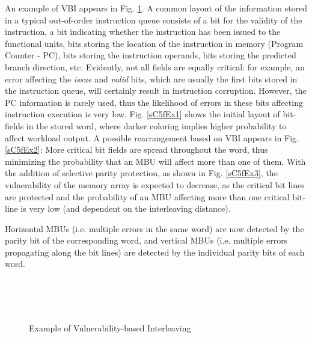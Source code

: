 \documentclass[12pt]{yalephd}
\begin{document}
An example of VBI appears in Fig. \ref{sC5fVBIExample}. A common layout of the information stored in a typical out-of-order instruction queue consists of a bit for the validity of the instruction, a bit indicating whether the instruction has been issued to the functional units, bits storing the location of the instruction in memory (Program Counter - PC), bits storing the instruction operands, bits storing the predicted branch direction, etc. Evidently, not all fields are equally critical: for example, an error affecting the {\em issue} and {\em valid} bits, which are usually the first bits stored in the instruction queue, will certainly result in instruction corruption. However, the PC information is rarely used, thus the likelihood of errors in these bits affecting instruction execution is very low. Fig. \ref{sC5fEx1} shows the initial layout of bit-fields in the stored word, where darker coloring implies higher probability to affect workload output. A possible rearrangement based on VBI appears in Fig. \ref{sC5fEx2}: More critical bit fields are spread throughout the word, thus minimizing the probability that an MBU will affect more than one of them. With the addition of selective parity protection, as shown in Fig. \ref{sC5fEx3}, the vulnerability of the memory array is expected to decrease, as the critical bit lines are protected and the probability of an MBU affecting more than one critical bit-line is very low (and dependent on the interleaving distance).

Horizontal MBUs (i.e. multiple errors in the same word) are now detected by the parity bit of the corresponding word, and vertical MBUs (i.e. multiple errors propagating along the bit lines) are detected by the individual parity bits of each word.

\begin{figure}[!ht]
    \centering
        \\
        \vspace{0.25in}
        \\
        \vspace{0.25in}
        \\
\vspace{0.25in}
\caption{Example of Vulnerability-based Interleaving}
\label{sC5fVBIExample}
\end{figure}
\end{document}
